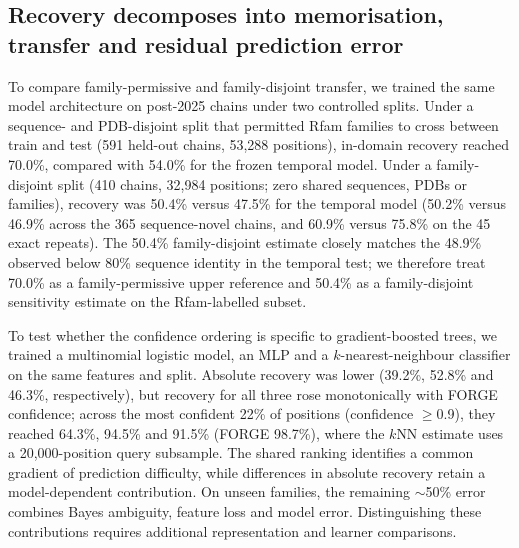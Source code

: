 \subsection{Recovery decomposes into memorisation, transfer and residual prediction error}
\label{sec:decomposition}

To compare family-permissive and family-disjoint transfer, we trained the same model architecture on post-2025 chains under two controlled splits. Under a sequence- and PDB-disjoint split that permitted Rfam families to cross between train and test (591 held-out chains, 53,288 positions), in-domain recovery reached 70.0\%, compared with 54.0\% for the frozen temporal model. Under a family-disjoint split (410 chains, 32,984 positions; zero shared sequences, PDBs or families), recovery was 50.4\% versus 47.5\% for the temporal model (50.2\% versus 46.9\% across the 365 sequence-novel chains, and 60.9\% versus 75.8\% on the 45 exact repeats). The 50.4\% family-disjoint estimate closely matches the 48.9\% observed below 80\% sequence identity in the temporal test; we therefore treat 70.0\% as a family-permissive upper reference and 50.4\% as a family-disjoint sensitivity estimate on the Rfam-labelled subset.

To test whether the confidence ordering is specific to gradient-boosted trees, we
trained a multinomial logistic model, an MLP and a $k$-nearest-neighbour classifier on
the same features and split. Absolute recovery was lower (39.2\%, 52.8\% and 46.3\%, respectively),
but recovery for all three rose monotonically with FORGE confidence; across the most confident 22\% of positions (confidence $\ge$0.9), they reached 64.3\%,
94.5\% and 91.5\% (FORGE 98.7\%), where the $k$NN estimate uses a 20,000-position query
subsample. The shared ranking identifies a common gradient of prediction difficulty,
while differences in absolute recovery retain a model-dependent contribution.
On unseen families, the remaining $\sim$50\% error combines Bayes ambiguity,
feature loss and model error. Distinguishing these contributions requires
additional representation and learner comparisons.

